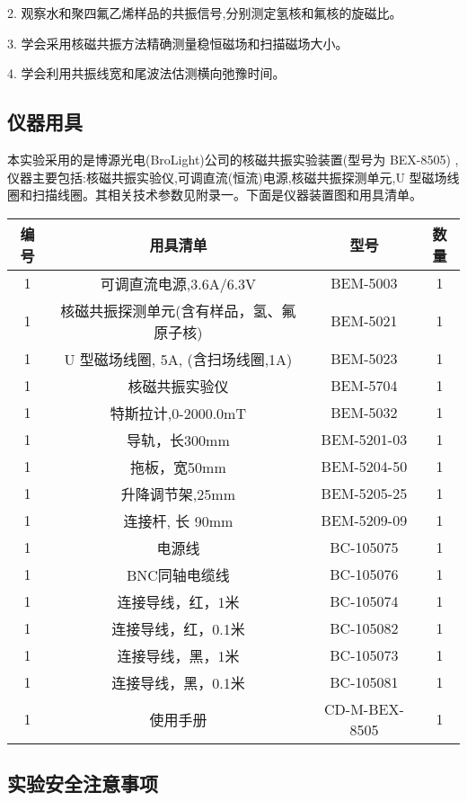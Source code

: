 \documentclass{ctexart}
\begin{document}
2. 观察水和聚四氟乙烯样品的共振信号,分别测定氢核和氟核的旋磁比。

3. 学会采用核磁共振方法精确测量稳恒磁场和扫描磁场大小。

4. 学会利用共振线宽和尾波法估测横向弛豫时间。

\subsection{仪器用具}
本实验采用的是博源光电(BroLight)公司的核磁共振实验装置(型号为 BEX-8505)
,仪器主要包括:核磁共振实验仪,可调直流(恒流)电源,核磁共振探测单元,U 型磁场线圈和扫描线圈。其相关技术参数见附录一。下面是仪器装置图和用具清单。

\begin{tabular}{c|c|c|c}
	\hline
        编号 & 用具清单 &型号& 数量 \\
	\hline 
	1& 可调直流电源,3.6A/6.3V & BEM-5003 &1 \\
        1& 核磁共振探测单元(含有样品，氢、氟原子核)& BEM-5021 &1 \\
        1&  U 型磁场线圈, 5A, (含扫场线圈,1A)& BEM-5023 &1 \\
        1& 核磁共振实验仪 & BEM-5704 &1 \\
        1& 特斯拉计,0-2000.0mT& BEM-5032 &1 \\
        1& 导轨，长300mm & BEM-5201-03 &1 \\
        1& 拖板，宽50mm & BEM-5204-50 &1 \\
        1& 升降调节架,25mm & BEM-5205-25 &1 \\
        1& 连接杆, 长 90mm & BEM-5209-09 &1 \\
        1& 电源线 & BC-105075 &1 \\
        1& BNC同轴电缆线 & BC-105076 &1 \\
        1& 连接导线，红，1米 & BC-105074 &1 \\
        1& 连接导线，红，0.1米 & BC-105082 &1 \\
        1& 连接导线，黑，1米 & BC-105073 &1 \\
        1& 连接导线，黑，0.1米 & BC-105081 &1 \\
        1& 使用手册 & CD-M-BEX-8505 &1 \\
	\hline
\end{tabular}


\subsection{实验安全注意事项}
\end{document}

